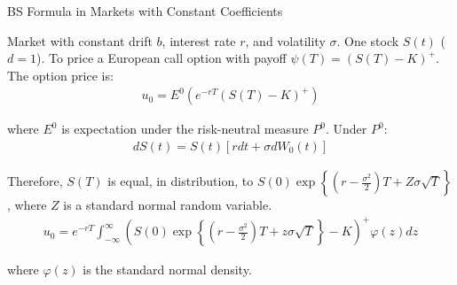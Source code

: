 \documentclass{beamer}
\begin{document}
\begin{frame}{BS Formula in Markets with Constant Coefficients}

    {\footnotesize \footnotesize
    \par  Market with constant drift \( b \), interest rate \( r \), and volatility $\sigma$. One stock \( S(t) \) (\( d = 1 \)). 
     To price a European call option with payoff $\psi(T) = (S(T) - K)^+. $ The option price is:
     \begin{align*}
        u_0 = E^0 \left( e^{-rT} (S(T) - K)^+\right)
     \end{align*}
     \par where \( E^0 \) is expectation under the risk-neutral measure \( P^0 \). Under \( P^0 \):
     \begin{align*}
        dS(t) = S(t)[rdt + \sigma dW_0(t)]
     \end{align*}
     \par  \pause Therefore, \( S(T) \) is equal, in distribution,
      to \( S(0) \exp \left\{ \left( r - \frac{\sigma^2}{2} \right) T + Z\sigma\sqrt{T} \right\} \), 
     where \( Z \) is a standard normal random variable.
     \begin{align*}
        u_0 = e^{-rT} \int_{-\infty}^{\infty} \left( S(0) \exp \left\{ \left( r - \frac{\sigma^2}{2} \right) T 
        + z\sigma\sqrt{T} \right\} - K \right)^+ \varphi(z) dz
     \end{align*}
     \par where \( \varphi(z) \) is the standard normal density.
    }
    
\end{frame}
\end{document}
